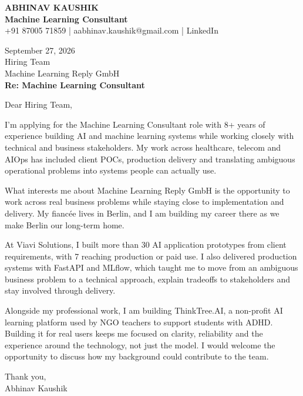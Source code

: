 \documentclass[10pt,a4paper]{article}
\begin{document}
\begin{center}
{\Large\bfseries ABHINAV KAUSHIK}\\[2pt]
{\bfseries Machine Learning Consultant}\\[2pt]
+91 87005 71859 \quad | \quad aabhinav.kaushik@gmail.com \quad | \quad LinkedIn
\end{center}
\vspace{8pt}
September 27, 2026\\[6pt]
Hiring Team\\
Machine Learning Reply GmbH\\[4pt]
\textbf{Re: Machine Learning Consultant}

Dear Hiring Team,

I’m applying for the Machine Learning Consultant role with 8+ years of experience building AI and machine learning systems while working closely with technical and business stakeholders. My work across healthcare, telecom and AIOps has included client POCs, production delivery and translating ambiguous operational problems into systems people can actually use.

What interests me about Machine Learning Reply GmbH is the opportunity to work across real business problems while staying close to implementation and delivery. My fiancée lives in Berlin, and I am building my career there as we make Berlin our long-term home.

At Viavi Solutions, I built more than 30 AI application prototypes from client requirements, with 7 reaching production or paid use. I also delivered production systems with FastAPI and MLflow, which taught me to move from an ambiguous business problem to a technical approach, explain tradeoffs to stakeholders and stay involved through delivery.

Alongside my professional work, I am building ThinkTree.AI, a non-profit AI learning platform used by NGO teachers to support students with ADHD. Building it for real users keeps me focused on clarity, reliability and the experience around the technology, not just the model. I would welcome the opportunity to discuss how my background could contribute to the team.

Thank you,\\
Abhinav Kaushik
\end{document}
